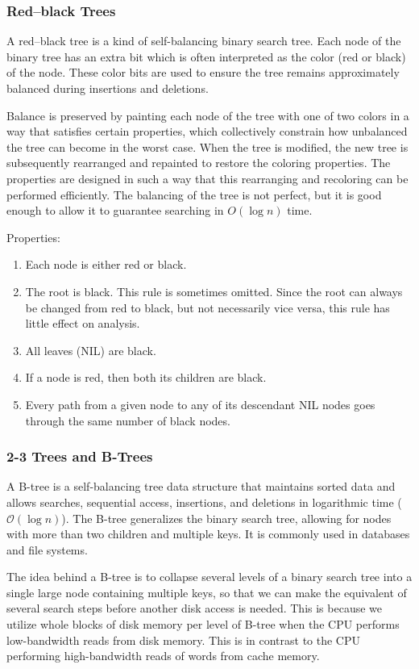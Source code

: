 \documentclass{article}
\newcommand{\bigO}{\mathcal{O}}
\begin{document}
    \subsubsection{Red–black Trees}
    A red–black tree is a kind of self-balancing binary search tree. Each node of the binary tree has an extra bit which is often interpreted as the color (red or black) of the node. These color bits are used to ensure the tree remains approximately balanced during insertions and deletions.
    
    Balance is preserved by painting each node of the tree with one of two colors in a way that satisfies certain properties, which collectively constrain how unbalanced the tree can become in the worst case. When the tree is modified, the new tree is subsequently rearranged and repainted to restore the coloring properties. The properties are designed in such a way that this rearranging and recoloring can be performed efficiently. The balancing of the tree is not perfect, but it is good enough to allow it to guarantee searching in $O(\log n)$ time.
    
    Properties:
    \begin{enumerate}
        \item Each node is either red or black.
        \item The root is black. This rule is sometimes omitted. Since the root can always be changed from red to black, but not necessarily vice versa, this rule has little effect on analysis.
        \item All leaves (NIL) are black.
        \item If a node is red, then both its children are black.
        \item Every path from a given node to any of its descendant NIL nodes goes through the same number of black nodes.
    \end{enumerate}
    
    \subsubsection{2-3 Trees and B-Trees}
    A B-tree is a self-balancing tree data structure that maintains sorted data and allows searches, sequential access, insertions, and deletions in logarithmic time ($\bigO(\log n)$). The B-tree generalizes the binary search tree, allowing for nodes with more than two children and multiple keys. It is commonly used in databases and file systems. 
    
    The idea behind a B-tree is to collapse several levels of a binary search tree into a single large node containing multiple keys, so that we can make the equivalent of several search steps before another disk access is needed. This is because we utilize whole blocks of disk memory per level of B-tree when the CPU performs low-bandwidth reads from disk memory. This is in contrast to the CPU performing high-bandwidth reads of words from cache memory.
    
\end{document}
